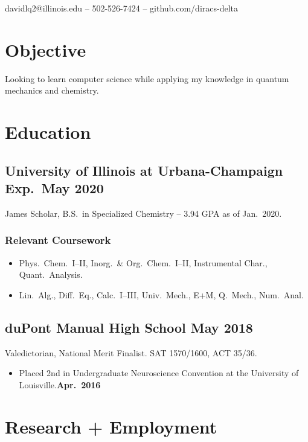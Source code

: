 \documentclass{article}
\makeatletter
\renewcommand{\maketitle}
{
	\begin{center}
	{\huge\bfseries\theauthor}

	\vspace{0.5em}
	davidlq2@illinois.edu -- 502-526-7424 -- github.com/diracs-delta
	\end{center}
}
\makeatother
\begin{document}
\author{David Qiu}
\maketitle

\section{Objective}
Looking to learn computer science while applying my knowledge in quantum
mechanics and chemistry.

\section{Education}

\subsection{University of Illinois at Urbana-Champaign \hfill Exp.\ May 2020}
James Scholar, B.S.\ in Specialized Chemistry -- 3.94 GPA as of Jan.\ 2020.

\subsubsection{Relevant Coursework}

\begin{itemize}[noitemsep,nolistsep]
	\item Phys.\ Chem.\ I--II, Inorg.\ \& Org.\ Chem.\ I--II, Instrumental
		Char., Quant.\ Analysis.

	\item Lin.\ Alg., Diff.\ Eq., Calc.\ I--III, Univ.\ Mech., E+M, Q.\
		Mech., Num.\ Anal.
\end{itemize}

\subsection{duPont Manual High School \hfill May 2018}
Valedictorian, National Merit Finalist. SAT 1570/1600, ACT 35/36.

\begin{itemize}[noitemsep,nolistsep]
	\item Placed 2nd in Undergraduate Neuroscience Convention at the University
		of Louisville.\hfill\textbf{Apr.\ 2016}
\end{itemize}

\section{Research + Employment}
\end{document}
